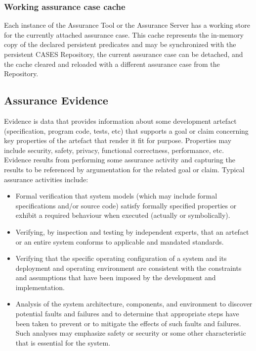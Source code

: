 \documentclass[12pt,twoside,a4paper]{article}
\begin{document}
\hypertarget{working-assurance-case-cache}{%
\subsubsection{Working assurance case cache}\label{working-assurance-case-cache}}

Each instance of the Assurance Tool or the Assurance Server has a working store for the currently attached assurance case. This cache represents the in-memory copy of the declared persistent predicates and may be synchronized with the persistent CASES Repository, the current assurance case can be detached, and the cache cleared and reloaded with a different assurance case from the Repository.

\hypertarget{assurance-evidence}{%
\subsection{Assurance Evidence}\label{assurance-evidence}}

Evidence is data that provides information about some development artefact (specification, program code, tests, etc) that supports a goal or claim concerning key properties of the artefact that render it fit for purpose. Properties may include security, safety, privacy, functional correctness, performance, etc. Evidence results from performing some assurance activity and capturing the results to be referenced by argumentation for the related goal or claim. Typical assurance activities include:

\begin{itemize}
\item
  Formal verification that system models (which may include formal specifications and/or source code) satisfy formally specified properties or exhibit a required behaviour when executed (actually or symbolically).
\item
  Verifying, by inspection and testing by independent experts, that an artefact or an entire system conforms to applicable and mandated standards.
\item
  Verifying that the specific operating configuration of a system and its deployment and operating environment are consistent with the constraints and assumptions that have been imposed by the development and implementation.
\item
  Analysis of the system architecture, components, and environment to discover potential faults and failures and to determine that appropriate steps have been taken to prevent or to mitigate the effects of such faults and failures. Such analyses may emphasize safety or security or some other characteristic that is essential for the system.
\end{itemize}
\end{document}
